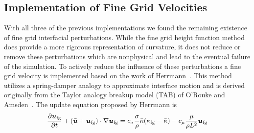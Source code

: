 \subsection{Implementation of Fine Grid Velocities}
With all three of the previous implementations we found the remaining existence of fine grid interfacial perturbations. While the fine grid height function method does provide a more rigorous representation of curvature, it does not reduce or remove these perturbations which are nonphysical and lead to the eventual failure of the simulation. To actively reduce the influence of these perturbations a fine grid velocity is implemented based on the work of Herrmann~\cite{Herrmann2013}. This method utilizes a spring-damper analogy to approximate interface motion and is derived  originally from the Taylor analogy breakup model (TAB) of O'Rouke and Amsden~\cite{TAB}. The update equation proposed by Herrmann  is 
\begin{equation}
\frac{\partial \mbox{\boldmath{$u$}}_{\text{fg}}}{\partial t} +
(\bar{\mbox{\boldmath{$u$}}}+\mbox{\boldmath{$u$}}_{\text{fg}}) \cdot \nabla \mbox{\boldmath{$u$}}_{\text{fg}} = \\
c_{\sigma}\frac{\sigma}{\rho}\bar{\kappa}(\kappa_{\text{fg}}-\bar{\kappa})- 
c_{\mu}\frac{\mu}{\rho L^2}\mbox{\boldmath{$u$}}_{\text{fg}}\nonumber
\label{eqn:HermEq}
\end{equation}

